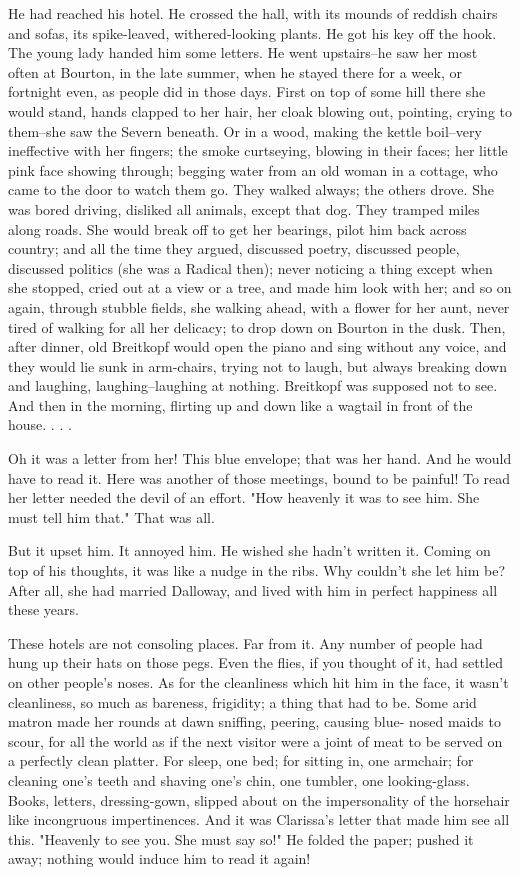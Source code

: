 \documentclass[lang=cn,10pt]{elegantbook}
\begin{document}
He had reached his hotel.  He crossed the hall, with its mounds of
reddish chairs and sofas, its spike-leaved, withered-looking
plants.  He got his key off the hook.  The young lady handed him
some letters.  He went upstairs--he saw her most often at Bourton,
in the late summer, when he stayed there for a week, or fortnight
even, as people did in those days.  First on top of some hill there
she would stand, hands clapped to her hair, her cloak blowing out,
pointing, crying to them--she saw the Severn beneath.  Or in a
wood, making the kettle boil--very ineffective with her fingers;
the smoke curtseying, blowing in their faces; her little pink face
showing through; begging water from an old woman in a cottage, who
came to the door to watch them go.  They walked always; the others
drove.  She was bored driving, disliked all animals, except that
dog.  They tramped miles along roads.  She would break off to get
her bearings, pilot him back across country; and all the time they
argued, discussed poetry, discussed people, discussed politics (she
was a Radical then); never noticing a thing except when she
stopped, cried out at a view or a tree, and made him look with her;
and so on again, through stubble fields, she walking ahead, with a
flower for her aunt, never tired of walking for all her delicacy;
to drop down on Bourton in the dusk.  Then, after dinner, old
Breitkopf would open the piano and sing without any voice, and they
would lie sunk in arm-chairs, trying not to laugh, but always
breaking down and laughing, laughing--laughing at nothing.
Breitkopf was supposed not to see.  And then in the morning,
flirting up and down like a wagtail in front of the house. . . .

Oh it was a letter from her!  This blue envelope; that was her
hand.  And he would have to read it.  Here was another of those
meetings, bound to be painful!  To read her letter needed the devil
of an effort.  "How heavenly it was to see him.  She must tell him
that."  That was all.

But it upset him.  It annoyed him.  He wished she hadn't written
it.  Coming on top of his thoughts, it was like a nudge in the
ribs.  Why couldn't she let him be?  After all, she had married
Dalloway, and lived with him in perfect happiness all these years.

These hotels are not consoling places.  Far from it.  Any number of
people had hung up their hats on those pegs.  Even the flies, if
you thought of it, had settled on other people's noses.  As for the
cleanliness which hit him in the face, it wasn't cleanliness, so
much as bareness, frigidity; a thing that had to be.  Some arid
matron made her rounds at dawn sniffing, peering, causing blue-
nosed maids to scour, for all the world as if the next visitor were
a joint of meat to be served on a perfectly clean platter.  For
sleep, one bed; for sitting in, one armchair; for cleaning one's
teeth and shaving one's chin, one tumbler, one looking-glass.
Books, letters, dressing-gown, slipped about on the impersonality
of the horsehair like incongruous impertinences.  And it was
Clarissa's letter that made him see all this.  "Heavenly to see
you.  She must say so!"  He folded the paper; pushed it away;
nothing would induce him to read it again!
\end{document}
